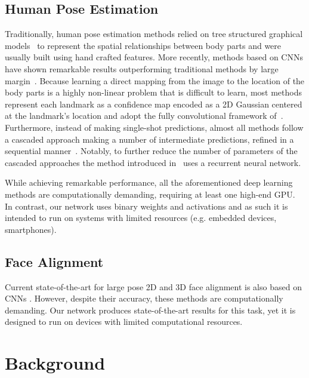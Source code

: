 \documentclass[10pt,journal,compsoc]{IEEEtran}
\begin{document}
\subsection{Human Pose Estimation} Traditionally, human pose estimation methods relied on tree structured graphical models~\cite{eichner20122d,buehler2011upper,yang2011articulated,pishchulin2013strong,sapp2013modec,belagiannis20143d} to represent the spatial relationships between body parts and were usually built using hand crafted features. More recently, methods based on CNNs have shown remarkable results outperforming traditional methods by large margin~\cite{toshev2014deeppose,tompson2014joint,pfister2015flowing,insafutdinov2016deepercut,bulat2016human,newell2016stacked,wei2016convolutional,belagiannis2017recurrent}. Because learning a direct mapping from the image to the location of the body parts is a highly non-linear problem that is difficult to learn, most methods represent each landmark as a confidence map encoded as a 2D Gaussian centered at the landmark's location and adopt the fully convolutional framework of~\cite{long2015fully}. {\color{black}Furthermore, instead of making single-shot predictions, almost all methods follow a cascaded approach making a number of intermediate predictions, refined in a sequential manner~\cite{bulat2016human,newell2016stacked,wei2016convolutional}. Notably, to further reduce the number of parameters of the cascaded approaches the method introduced  in~\cite{belagiannis2017recurrent} uses a recurrent neural network.}

While achieving remarkable performance, all the aforementioned deep learning methods are computationally demanding, requiring at least one high-end GPU. In contrast, our network uses binary weights and activations and as such it is intended to run on systems with limited resources (e.g. embedded devices, smartphones).

\subsection{Face Alignment}
Current state-of-the-art for large pose 2D and 3D face alignment is also based on CNNs \cite{jourabloo2016large,bulat2016convolutional,bulat2016two,ranjan2017all,bulat2017far,wu2017godp}. However, despite their accuracy, these methods are computationally demanding. Our network produces state-of-the-art results for this task, yet it is designed to run on devices with limited computational resources.

\section{Background}\label{sec:method}
\end{document}
